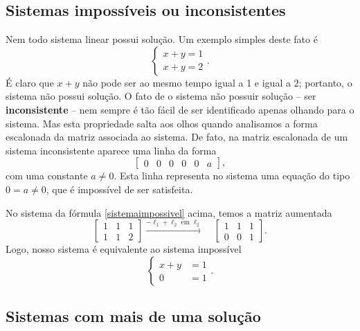 \subsection{Sistemas impossíveis ou inconsistentes}

Nem todo sistema linear possui solução. Um exemplo simples deste fato é
\begin{equation}\label{sistemaimpossivel}
\left\{
  \begin{array}{ll}
    x+y = 1\\
    x+y = 2
  \end{array}
\right. .
\end{equation} É claro que $x+y$ não pode ser ao mesmo tempo igual a 1 e igual a 2; portanto, o sistema não possui solução. O fato de o sistema não possuir solução -- ser \textbf{inconsistente} -- nem sempre é tão fácil de ser identificado apenas olhando para o sistema. Mas esta propriedade salta aos olhos quando analisamos a forma escalonada da matriz associada ao sistema. De fato, na matriz escalonada de um sistema inconsistente aparece uma linha da forma
\begin{equation}
\left[
\begin{array}{ccccc|c}
   0&0&0&0&0&a
\end{array}
\right],
\end{equation} com uma constante $a \neq 0$. Esta linha representa no sistema uma equação do tipo $0 = a \neq 0$, que é impossível de ser satisfeita.

No sistema da fórmula \eqref{sistemaimpossivel} acima, temos a matriz aumentada
\begin{equation}
\left[
\begin{array}{cc|c}
   1 & 1 & 1 \\
   1 & 1 & 2
\end{array}
\right]
\xrightarrow{-\ell_1 + \ell_2 \text{ em } \ell_2} \quad
\left[
\begin{array}{cc|c}
   1 & 1 & 1 \\
   0 & 0 & 1
\end{array}
\right].
\end{equation} Logo, nosso sistema é equivalente ao sistema impossível
\begin{equation}
\left\{
  \begin{array}{rl}
    x+y &= 1\\
     0  &= 1
  \end{array}
\right. .
\end{equation}


\subsection{Sistemas com mais de uma solução}

